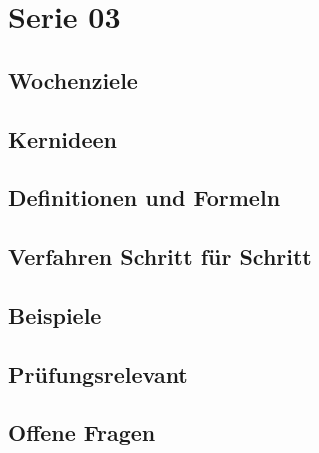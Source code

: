 \chapter{Serie 03}
\label{kap:serie03}

\section*{Wochenziele}
\begin{wochenziele}
\end{wochenziele}

\section{Kernideen}

\section{Definitionen und Formeln}

\section{Verfahren Schritt für Schritt}

\section{Beispiele}

\section{Prüfungsrelevant}

\section{Offene Fragen}
